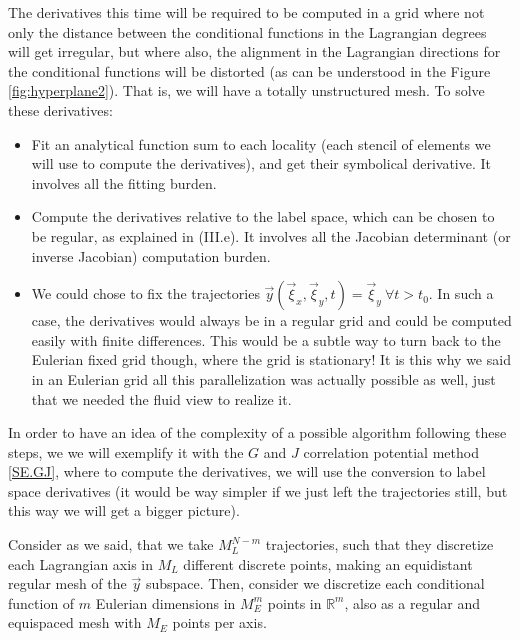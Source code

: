 \documentclass[11pt, a4paper]{article} %
\newcommand{\R}{\mathbb{R}} %
\begin{document}
The derivatives this time will be required to be computed in a grid where not only the distance between the conditional functions in the Lagrangian degrees will get irregular, but where also, the alignment in the Lagrangian directions for the conditional functions will be distorted (as can be understood in the Figure \ref{fig:hyperplane2}). That is, we will have a totally unstructured mesh. To solve these derivatives:
\begin{itemize}
\item Fit an analytical function sum to each locality (each stencil of elements we will use to compute the derivatives), and get their symbolical derivative. It involves all the fitting burden.
\item Compute the derivatives relative to the label space, which can be chosen to be regular, as explained in (III.e). It involves all the Jacobian determinant (or inverse Jacobian) computation burden.
\item We could chose to fix the trajectories $\vec{y}(\vec{\xi}_x, \vec{\xi}_y,t)=\vec{\xi}_y\ \forall t>t_0$. In such a case, the derivatives would always be in a regular grid and could be computed easily with finite differences. This would be a subtle way to turn back to the Eulerian fixed grid though, where the grid is stationary! It is this why we said in an Eulerian grid all this parallelization was actually possible as well, just that we needed the fluid view to realize it.
\end{itemize}

In order to have an idea of the complexity of a possible algorithm following these steps, we we will exemplify it with the $G$ and $J$ correlation potential method \eqref{SE.GJ}, where to compute the derivatives, we will use the conversion to label space derivatives (it would be way simpler if we just left the trajectories still, but this way we will get a bigger picture).

Consider as we said, that we take $M_L^{N-m}$ trajectories, such that they discretize each Lagrangian axis in $M_{L}$ different discrete points, making an equidistant regular mesh of the $\vec{y}$ subspace. Then, consider we discretize each conditional function of $m$ Eulerian dimensions in $M_E^m$ points in $\R^m$, also as a regular and equispaced mesh with $M_E$ points per axis.
\end{document}
